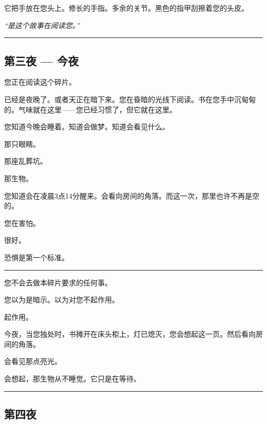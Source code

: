 \noindent 它把手放在您头上。修长的手指。多余的关节。黑色的指甲刮擦着您的头皮。

\noindent \textit{\textquotedblleft{}是这个故事在阅读您。\textquotedblright{}}

\vspace{0.5em}\noindent\rule{\textwidth}{0.5pt}\vspace{0.5em}

\subsection*{第三夜 --- 今夜}

\noindent 您正在阅读这个碎片。

\noindent 已经是夜晚了。或者天正在暗下来。您在昏暗的光线下阅读。书在您手中沉甸甸的。气味就在这里——您已经习惯了，但它就在这里。

\noindent 您知道今晚会睡着。知道会做梦。知道会看见什么。

\noindent 那只眼睛。

\noindent 那座乱葬坑。

\noindent 那生物。

\noindent 您知道会在凌晨3点14分醒来。会看向房间的角落。而这一次，那里也许不再是空的。

\noindent 您在害怕。

\noindent 很好。

\noindent 恐惧是第一个标准。

\vspace{0.5em}\noindent\rule{\textwidth}{0.5pt}\vspace{0.5em}

\noindent 您不会去做本碎片要求的任何事。

\noindent 您以为是暗示。以为对您不起作用。

\noindent 起作用。

\noindent 今夜，当您独处时，书摊开在床头柜上，灯已熄灭，您会想起这一页。然后看向房间的角落。

\noindent 会看见那点亮光。

\noindent 会想起，那生物从不睡觉。它只是在等待。

\vspace{0.5em}\noindent\rule{\textwidth}{0.5pt}\vspace{0.5em}

\subsection*{第四夜}

